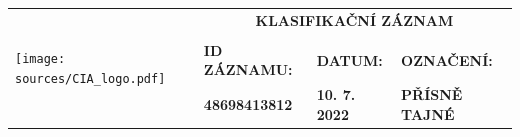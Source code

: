 \documentclass[a4paper, 11pt]{article}
\newcommand{\blackcell}{\cellcolor{black} \color{white} \ttfamily \bfseries}
\begin{document}
	\noindent
	\begin{table}[H]
		\renewcommand\tabularxcolumn[1]{m{#1}}
		\def\arraystretch{1.5}
		\begin{tabularx}{\textwidth}{l X X X}
			\multirow{4}{*}{ \texttt{[image: sources/CIA\_logo.pdf]} } & \multicolumn{3}{c}{\bfseries \ttfamily \Huge KLASIFIKAČNÍ ZÁZNAM} \\
			&&&\\
			& \blackcell ID ZÁZNAMU: & \blackcell DATUM: & \blackcell OZNAČENÍ: \\
			& \blackcell 48698413812 & \blackcell 10. 7. 2022 & \blackcell PŘÍSNĚ TAJNÉ \\
			
		\end{tabularx}
	\end{table}
	
\end{document}
